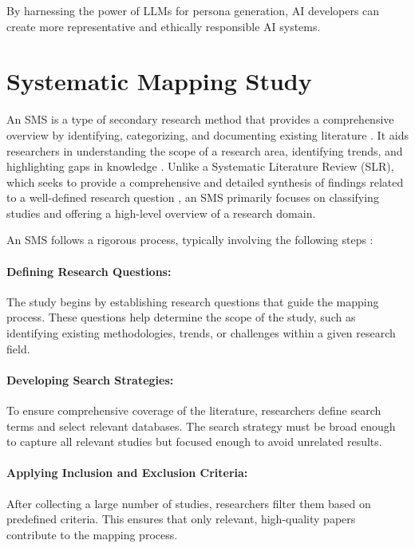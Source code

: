 By harnessing the power of LLMs for persona generation, AI developers can create more representative and ethically responsible AI systems.





\section{Systematic Mapping Study}
An SMS is a type of secondary research method that provides a comprehensive overview by identifying, categorizing, and documenting existing literature \cite{petersen2008systematic}. 
It aids researchers in understanding the scope of a research area, identifying trends, and highlighting gaps in knowledge \cite{almendra2020incremental}. Unlike a Systematic Literature Review (SLR), which seeks to provide a comprehensive and 
detailed synthesis of findings related to a well-defined research question \cite{bombonatti2016usability}, an SMS primarily focuses on classifying studies and offering a high-level overview of a research domain.

An SMS follows a rigorous process, typically involving the following steps \cite{almendra2020incremental}:
\paragraph{\textbf{Defining Research Questions:}}
The study begins by establishing research questions that guide the mapping process. These questions help determine the scope of the study, 
such as identifying existing methodologies, trends, or challenges within a given research field.

\paragraph{\textbf{Developing Search Strategies:}} 
To ensure comprehensive coverage of the literature, researchers define search terms and select relevant databases. The search strategy must be 
broad enough to capture all relevant studies but focused enough to avoid unrelated results.

\paragraph{\textbf{Applying Inclusion and Exclusion Criteria:}}
After collecting a large number of studies, researchers filter them based on predefined criteria. This ensures that only relevant, high-quality papers contribute to the mapping process.

